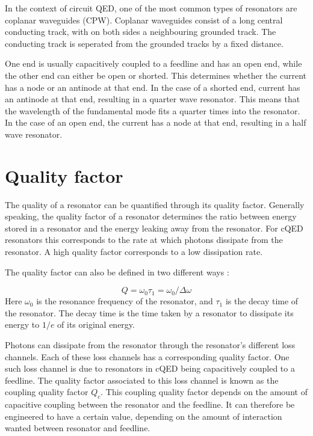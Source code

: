     In the context of circuit QED, one of the most common types of resonators are coplanar waveguides (CPW). Coplanar waveguides consist of a long central conducting track, with on both sides a neighbouring grounded track. The conducting track is seperated from the grounded tracks by a fixed distance.

    One end is usually capacitively coupled to a feedline and has an open end, while the other end can either be open or shorted. This determines whether the current has a node or an antinode at that end. In the case of a shorted end, current has an antinode at that end, resulting in a quarter wave resonator. This means that the wavelength of the fundamental mode fits a quarter times into the resonator. In the case of an open end, the current has a node at that end, resulting in a half wave resonator.


  \section{Quality factor}
    \label{sec:Quality factor}
    The quality of a resonator can be quantified through its quality factor. Generally speaking, the quality factor of a resonator determines the ratio between energy stored in a resonator and the energy leaking away from the resonator. For cQED resonators this corresponds to the rate at which photons dissipate from the resonator. A high quality factor corresponds to a low dissipation rate.

    The quality factor can also be defined in two different ways \cite[pp.23-24]{Mazin}:

    \begin{equation}
        Q = \omega_0 \tau_1 = \omega_0 / \Delta \omega
        \label{eqn:quality factor definition}
    \end{equation}
    Here $\omega_0$ is the resonance frequency of the resonator, and $\tau_1$ is the decay time of the resonator. The decay time is the time taken by a resonator to dissipate its energy to $1/e$ of its original energy.

    Photons can dissipate from the resonator through the resonator's different loss channels. Each of these loss channels has a corresponding quality factor. One such loss channel is due to resonators in cQED being capacitively coupled to a feedline. The quality factor associated to this loss channel is known as the coupling quality factor $Q_c$. This coupling quality factor depends on the amount of capacitive coupling between the resonator and the feedline. It can therefore be engineered to have a certain value, depending on the amount of interaction wanted between resonator and feedline.

